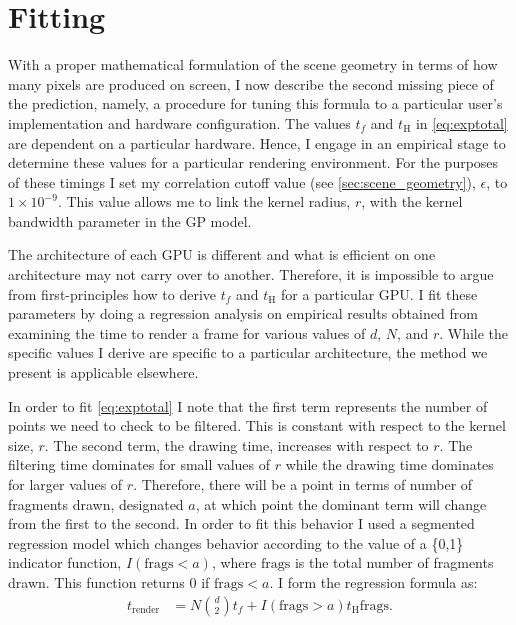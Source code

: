 \section{Fitting}
\label{sec:fitting}

With a proper mathematical formulation of the scene geometry in terms of how
many pixels are produced on screen, I now describe the second missing piece of
the prediction, namely, a procedure for tuning this formula to a particular
user's implementation and hardware configuration.  The values $t_f$ and
$t_\text{H}$ in \autoref{eq:exptotal} are dependent on a particular hardware.
Hence, I engage in an empirical stage to determine these values for a
particular rendering environment.  For the purposes of these timings I set my
correlation cutoff value (see \autoref{sec:scene_geometry}), $\epsilon$, to $1
\times 10^{-9}$. This value allows me to link the kernel radius, $r$, with the
kernel bandwidth parameter in the GP model.

The architecture of each GPU is different and what is efficient on one 
architecture may not carry over to another.
Therefore, it is
impossible to argue from first-principles how to derive $t_f$ and $t_\text{H}$ 
for a
particular GPU. I fit these parameters by doing a regression analysis
on empirical results obtained from examining the time to render a frame for
various values of $d$, $N$, and $r$. While the specific values I derive are 
specific to a particular architecture,
the method we present is applicable
elsewhere. 

In order to fit \autoref{eq:exptotal} I note that the first term
represents the number of points we need to check to be filtered. This is 
constant
with respect to the kernel size, $r$. The second term, the drawing
time, increases with respect to $r$. The filtering time dominates
for small values of $r$ while the drawing time dominates for larger values of 
$r$.
Therefore, there will be a point in terms of number of fragments drawn, 
designated $a$, at which point the dominant term will change from the first to
the second. In order to fit this behavior I used a segmented regression
model which changes behavior according to the value of a \{0,1\} indicator
function, $I(\text{frags}<a)$, where $\text{frags}$ is the total number of 
fragments drawn. This 
function returns 0 if $\text{frags} < a$. I form the regression
formula as:
\begin{align}
  t_\text{render} &= N {d \choose 2} t_f + I(\text{frags} > a) t_\text{H} \text{frags}  \text{.}
  \label{eq:calib-acttotal-H}
\end{align}

